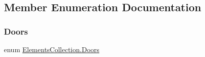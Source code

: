 \subsection{Member Enumeration Documentation}
\mbox{\label{class_elements_collection_a21917dc4f24ee93da7275d2fd256d0ff}} 
\subsubsection{\texorpdfstring{Doors}{Doors}}
{\footnotesize\ttfamily enum \mbox{\hyperlink{class_elements_collection_a21917dc4f24ee93da7275d2fd256d0ff}{Elements\+Collection.\+Doors}}\hspace{0.3cm}{\ttfamily [strong]}}

